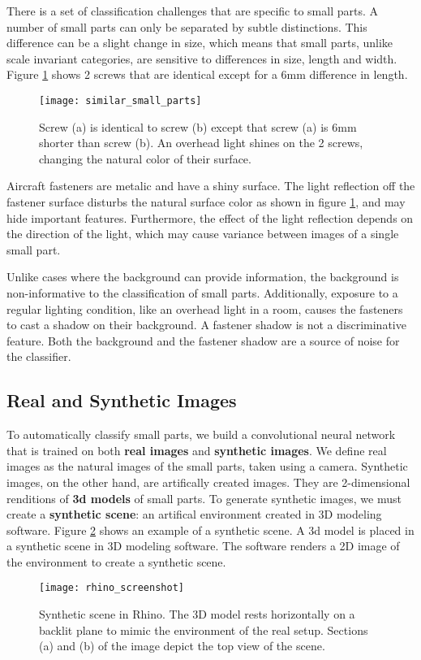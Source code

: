 There is a set of classification challenges that are specific to small parts. A number of small parts can only be separated by subtle distinctions. This difference can be a slight change in size, which means that small parts, unlike scale invariant categories, are sensitive to differences in size, length and width. Figure \ref{fig:similar_small_parts} shows 2 screws that are identical except for a 6mm difference in length.

\begin{figure}[h]
\centering
  \texttt{[image: similar\_small\_parts]}
\caption{Screw (a) is identical to screw (b) except that screw (a) is 6mm shorter than screw (b). An overhead light shines on the 2 screws, changing the natural color of their surface.}
\label{fig:similar_small_parts}
\end{figure}

Aircraft fasteners are metalic and have a shiny surface. The light reflection off the fastener surface disturbs the natural surface color as shown in figure \ref{fig:similar_small_parts}, and may hide important features. Furthermore, the effect of the light reflection depends on the direction of the light, which may cause variance between images of a single small part.

Unlike cases where the background can provide information, the background is non-informative to the classification of small parts. Additionally, exposure to a regular lighting condition, like an overhead light in a room, causes the fasteners to cast a shadow on their background. A fastener shadow is not a discriminative feature. Both the background and the fastener shadow are a source of noise for the classifier.

\subsection{Real and Synthetic Images}
To automatically classify small parts, we build a convolutional neural network that is trained on both \textbf{real images} and \textbf{synthetic images}. We define real images as the natural images of the small parts, taken using a camera. Synthetic images, on the other hand, are artifically created images. They are 2-dimensional renditions of \textbf{3d models} of small parts. To generate synthetic images, we must create a \textbf{synthetic scene}: an artifical environment created in 3D modeling software. Figure \ref{fig:synthetic_scene} shows an example of a synthetic scene. A 3d model is placed in a synthetic scene in 3D modeling software. The software renders a 2D image of the environment to create a synthetic scene.

\begin{figure}[h]
\centering
  \texttt{[image: rhino\_screenshot]}
\caption{Synthetic scene in Rhino. The 3D model rests horizontally on a backlit plane to mimic the environment of the real setup. Sections (a) and (b) of the image depict the top view of the scene.}
\label{fig:synthetic_scene}
\end{figure}
